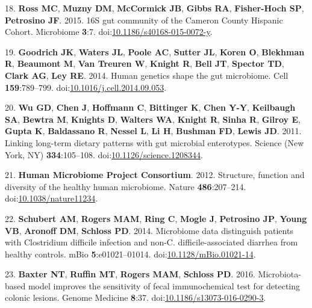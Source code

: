 \documentclass[12pt,]{article}
\begin{document}
\hypertarget{ref-rossux5f16sux5f2015}{}
18. \textbf{Ross MC}, \textbf{Muzny DM}, \textbf{McCormick JB},
\textbf{Gibbs RA}, \textbf{Fisher-Hoch SP}, \textbf{Petrosino JF}. 2015.
16S gut community of the Cameron County Hispanic Cohort. Microbiome
\textbf{3}:7.
doi:\href{https://doi.org/10.1186/s40168-015-0072-y}{10.1186/s40168-015-0072-y}.

\hypertarget{ref-goodrichux5fhumanux5f2014}{}
19. \textbf{Goodrich JK}, \textbf{Waters JL}, \textbf{Poole AC},
\textbf{Sutter JL}, \textbf{Koren O}, \textbf{Blekhman R},
\textbf{Beaumont M}, \textbf{Van Treuren W}, \textbf{Knight R},
\textbf{Bell JT}, \textbf{Spector TD}, \textbf{Clark AG}, \textbf{Ley
RE}. 2014. Human genetics shape the gut microbiome. Cell
\textbf{159}:789--799.
doi:\href{https://doi.org/10.1016/j.cell.2014.09.053}{10.1016/j.cell.2014.09.053}.

\hypertarget{ref-wuux5flinkingux5f2011}{}
20. \textbf{Wu GD}, \textbf{Chen J}, \textbf{Hoffmann C},
\textbf{Bittinger K}, \textbf{Chen Y-Y}, \textbf{Keilbaugh SA},
\textbf{Bewtra M}, \textbf{Knights D}, \textbf{Walters WA},
\textbf{Knight R}, \textbf{Sinha R}, \textbf{Gilroy E}, \textbf{Gupta
K}, \textbf{Baldassano R}, \textbf{Nessel L}, \textbf{Li H},
\textbf{Bushman FD}, \textbf{Lewis JD}. 2011. Linking long-term dietary
patterns with gut microbial enterotypes. Science (New York, NY)
\textbf{334}:105--108.
doi:\href{https://doi.org/10.1126/science.1208344}{10.1126/science.1208344}.

\hypertarget{ref-humanux5fmicrobiomeux5fprojectux5fconsortiumux5fstructureux5f2012}{}
21. \textbf{Human Microbiome Project Consortium}. 2012. Structure,
function and diversity of the healthy human microbiome. Nature
\textbf{486}:207--214.
doi:\href{https://doi.org/10.1038/nature11234}{10.1038/nature11234}.

\hypertarget{ref-schubertux5fmicrobiomeux5f2014}{}
22. \textbf{Schubert AM}, \textbf{Rogers MAM}, \textbf{Ring C},
\textbf{Mogle J}, \textbf{Petrosino JP}, \textbf{Young VB},
\textbf{Aronoff DM}, \textbf{Schloss PD}. 2014. Microbiome data
distinguish patients with Clostridium difficile infection and non-C.
difficile-associated diarrhea from healthy controls. mBio
\textbf{5}:e01021--01014.
doi:\href{https://doi.org/10.1128/mBio.01021-14}{10.1128/mBio.01021-14}.

\hypertarget{ref-baxterux5fmicrobiota-basedux5f2016}{}
23. \textbf{Baxter NT}, \textbf{Ruffin MT}, \textbf{Rogers MAM},
\textbf{Schloss PD}. 2016. Microbiota-based model improves the
sensitivity of fecal immunochemical test for detecting colonic lesions.
Genome Medicine \textbf{8}:37.
doi:\href{https://doi.org/10.1186/s13073-016-0290-3}{10.1186/s13073-016-0290-3}.
\end{document}
